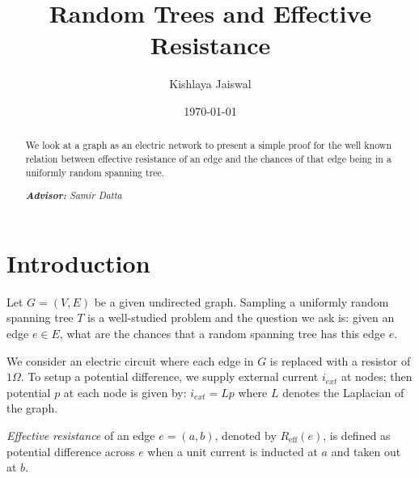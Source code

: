 \documentclass[10pt]{article}
\title{Random Trees and Effective Resistance}
\author{Kishlaya Jaiswal\\%
    }
\date{\today}
\theoremstyle{plain}
\begin{document}
{
\maketitle
\begin{abstract}

We look at a graph as an electric network to present a simple proof for the well known relation between effective resistance of an edge and the chances of that edge being in a uniformly random spanning tree.

\noindent
\textit{\textbf{Advisor: }%
Samir Datta} \\ %

\end{abstract}
}



\section{Introduction}

Let $G=(V,E)$ be a given undirected graph. Sampling a uniformly random spanning tree $T$ is a well-studied problem and the question we ask is: given an edge $e \in E$, what are the chances that a random spanning tree has this edge $e$.

We consider an electric circuit where each edge in $G$ is replaced with a resistor of $1 \Omega$. To setup a potential difference, we supply external current $i_{ext}$ at nodes; then potential $p$ at each node is given by: $i_{ext} = Lp$ where $L$ denotes the Laplacian of the graph.

\textsl{Effective resistance} of an edge $e=(a,b)$, denoted by $R_{\text{eff}}(e)$, is defined as potential difference across $e$ when a unit current is inducted at $a$ and taken out at $b$.
\end{document}

